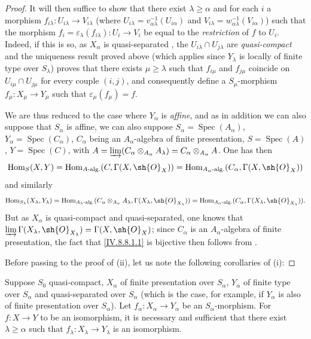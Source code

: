 \begin{proof}
It will then suffice to show that there exist $\lambda\geqslant\alpha$ and for each $i$ a morphism $f_{i\lambda}:U_{i\lambda}\to V_{i\lambda}$ (where $U_{i\lambda}=v_{\alpha\lambda}^{-1}(U_{i\alpha})$ and $V_{i\lambda}=w_{\alpha\lambda}^{-1}(V_{i\alpha})$) such that the morphism $f_i=\varepsilon_\lambda(f_{i\lambda}):U_i\to V_i$ be equal to the \emph{restriction} of $f$ to $U_i$.
Indeed, if this is so, as $X_\alpha$ is quasi-separated , the $U_{i\lambda}\cap U_{j\lambda}$ are \emph{quasi-compact} and the uniqueness result proved above (which applies since $Y_\lambda$ is locally of finite type over $S_\lambda$) proves that there exists $\mu\geqslant\lambda$ such that $f_{i\mu}$ and $f_{j\mu}$ coincide on $U_{i\mu}\cap U_{j\mu}$ for every couple $(i,j)$, and consequently define a $S_\mu$-morphism $f_\mu:X_\mu\to Y_\mu$ such that $\varepsilon_\mu(f_\mu)=f$.

We are thus reduced to the case where $Y_\alpha$ is \emph{affine}, and as in addition we can also suppose that $S_\alpha$ is affine, we can also suppose $S_\alpha=\operatorname{Spec}(A_\alpha)$, $Y_\alpha=\operatorname{Spec}(C_\alpha)$, $C_\alpha$ being an $A_\alpha$-algebra of finite presentation, $S=\operatorname{Spec}(A)$, $Y=\operatorname{Spec}(C)$, with $A=\varinjlim(C_\alpha\otimes_{A_\alpha}A_\lambda)=C_\alpha\otimes_{A_\alpha}A$.
One has then
\[
  \operatorname{Hom}_S(X,Y)=\operatorname{Hom}_{A\text{-alg.}}(C,\Gamma(X,\sh{O}_X))=\operatorname{Hom}_{A_\alpha\text{-alg.}}(C_\alpha,\Gamma(X,\sh{O}_X))
\]
 and similarly
\[
  \operatorname{Hom}_{S_\lambda}(X_\lambda,Y_\lambda)=\operatorname{Hom}_{A_\lambda\text{-alg.}}(C_\alpha\otimes_{A_\alpha}A_\lambda,\Gamma(X_\lambda,\sh{O}_{X_\lambda}))=\operatorname{Hom}_{A_\alpha\text{-alg.}}(C_\alpha,\Gamma(X_\lambda,\sh{O}_{X_\lambda})).
\]
But as $X_\alpha$ is quasi-compact and quasi-separated, one knows  that $\varinjlim\Gamma(X_\lambda,\sh{O}_{X_\lambda})=\Gamma(X,\sh{O}_X)$; since $C_\alpha$ is an $A_\alpha$-algebra of finite presentation, the fact that \eqref{IV.8.8.1.1} is bijective then follows from .

Before passing to the proof of (ii), let us note the following corollaries of (i):
\end{proof}

\begin{corollary}[8.8.2.4]
\label{IV.8.8.2.4}
Suppose $S_0$ quasi-compact, $X_\alpha$ of finite presentation over $S_\alpha$, $Y_\alpha$ of finite type over $S_\alpha$ and quasi-separated over $S_\alpha$ (which is the case, for example, if $Y_\alpha$ is also
of finite presentation over $S_\alpha$).
Let $f_\alpha:X_\alpha\to Y_\alpha$ be an $S_\alpha$-morphism.
For $f:X\to Y$ to be an isomorphism, it is necessary and sufficient that there exist $\lambda\geqslant\alpha$ such that $f_\lambda:X_\lambda\to Y_\lambda$ is an isomorphism.
\end{corollary}

